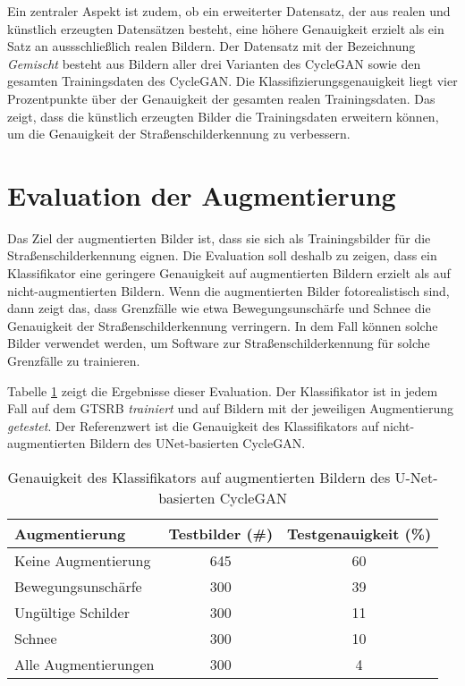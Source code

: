 Ein zentraler Aspekt ist zudem, ob ein erweiterter Datensatz, der aus realen und künstlich erzeugten Datensätzen besteht, eine höhere Genauigkeit erzielt als ein Satz an aussschließlich realen Bildern. Der Datensatz mit der Bezeichnung \emph{Gemischt} besteht aus Bildern aller drei Varianten des \ac{CycleGAN} sowie den gesamten Trainingsdaten des \ac{CycleGAN}. Die Klassifizierungsgenauigkeit liegt vier Prozentpunkte über der Genauigkeit der gesamten realen Trainingsdaten. Das zeigt, dass die künstlich erzeugten Bilder die Trainingsdaten erweitern können, um die Genauigkeit der Straßenschilderkennung zu verbessern.

\section{Evaluation der Augmentierung}

Das Ziel der augmentierten Bilder ist, dass sie sich als Trainingsbilder für die Straßenschilderkennung eignen. Die Evaluation soll deshalb zu zeigen, dass ein Klassifikator eine geringere Genauigkeit auf augmentierten Bildern erzielt als auf nicht-augmentierten Bildern. Wenn die augmentierten Bilder fotorealistisch sind, dann zeigt das, dass Grenzfälle wie etwa Bewegungsunschärfe und Schnee die Genauigkeit der Straßenschilderkennung verringern. In dem Fall können solche Bilder verwendet werden, um Software zur Straßenschilderkennung für solche Grenzfälle zu trainieren.

Tabelle \ref{tab:augmentation-classification-acc} zeigt die Ergebnisse dieser Evaluation. Der Klassifikator ist in jedem Fall auf dem \ac{GTSRB} \emph{trainiert} und auf Bildern mit der jeweiligen Augmentierung \emph{getestet}. Der Referenzwert ist die Genauigkeit des Klassifikators auf nicht-augmentierten Bildern des UNet-basierten \ac{CycleGAN}.

\begin{table}[h]
	\centering
	\begin{tabular}{|l|c|c|}
	\hline
	Augmentierung & Testbilder (\#) & Testgenauigkeit\tablefootnote{Eines Klassifikators auf dieser Augmentierung. Der Klassifikator ist auf dem \ac{GTSRB} trainiert.} (\%) \\ \hline \hline
	Keine Augmentierung & 645 & 60 \\ \hline \hline
	Bewegungsunschärfe & 300 & 39 \\ \hline
   Ungültige Schilder & 300 & 11 \\ \hline
   Schnee & 300 & 10 \\ \hline \hline
	Alle Augmentierungen & 300 & 4 \\ \hline
	\end{tabular}
	\caption{Genauigkeit des Klassifikators auf augmentierten Bildern des U-Net-basierten \ac{CycleGAN}}
	\label{tab:augmentation-classification-acc}
\end{table}

